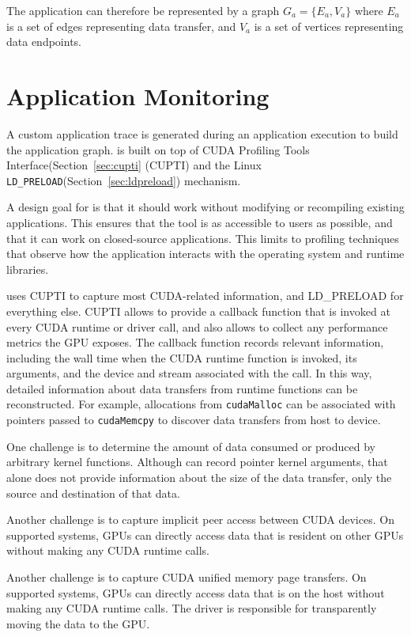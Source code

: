 The application can therefore be represented by a graph $G_a = \{E_a,V_a\}$ where $E_a$ is a set of edges representing data transfer, and $V_a$ is a set of vertices representing data endpoints.

\section{Application Monitoring}

A custom application trace is generated during an application execution to build the application graph.
 is built on top of CUDA Profiling Tools Interface(Section~\ref{sec:cupti} (CUPTI) and the Linux \texttt{LD\_PRELOAD}(Section~\ref{sec:ldpreload}) mechanism.

A design goal for  is that it should work without modifying or recompiling existing applications.
This ensures that the tool is as accessible to users as possible, and that it can work on closed-source applications.
This limits  to profiling techniques that observe how the application interacts with the operating system and runtime libraries.

 uses CUPTI to capture most CUDA-related information, and LD\_PRELOAD for everything else.
CUPTI allows  to provide a callback function that is invoked at every CUDA runtime or driver call, and also allows  to collect any performance metrics the GPU exposes.
The callback function records relevant information, including the wall time when the CUDA runtime function is invoked, its arguments, and the device and stream associated with the call.
In this way, detailed information about data transfers from runtime functions can be reconstructed.
For example, allocations from \texttt{cudaMalloc} can be associated with pointers passed to \texttt{cudaMemcpy} to discover data transfers from host to device.

One challenge is to determine the amount of data consumed or produced by arbitrary kernel functions.
Although  can record pointer kernel arguments, that alone does not provide information about the size of the data transfer, only the source and destination of that data.

Another challenge is to capture implicit peer access between CUDA devices.
On supported systems, GPUs can directly access data that is resident on other GPUs without making any CUDA runtime calls.

Another challenge is to capture CUDA unified memory page transfers.
On supported systems, GPUs can directly access data that is on the host without making any CUDA runtime calls.
The driver is responsible for transparently moving the data to the GPU.


